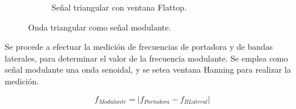 \begin{figure}[H]
\begin{subfigure}[H]{0.48\textwidth}
          \label{fig:Exp6SeñalFMModulanteTriangularRectangular}
        \end{subfigure}
       \begin{subfigure}[H]{0.3\textwidth}
          \caption{Señal triangular con ventana Flattop.}
          \label{fig:Exp6SeñalFMModulanteTriangularFlattop}
        \end{subfigure}
        \caption{Onda triangular como señal modulante.}
        \label{fig:Exp6SeñalFMModulanteTriangular}
      \end{figure}         

    Se procede a efectuar la medición de frecuencias de portadora y de bandas 
    laterales, para determinar el valor de la frecuencia modulante. Se emplea como 
    señal modulante una onda senoidal, y se setea ventana Hanning para realizar 
    la medición.

      \begin{equation}
        f_{Modulante}=|f_{Portadora}-f_{BLateral}|
        \label{eqn:Exp6CalculoModulante}
      \end{equation}

